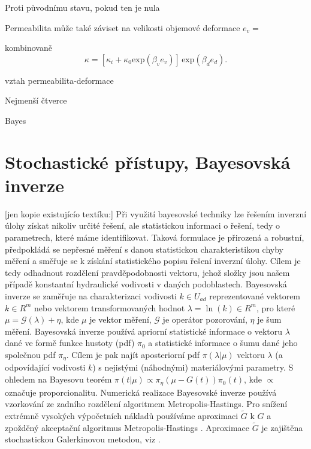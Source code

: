 \documentclass[a4paper]{article}
\begin{document}
Proti původnímu stavu, pokud ten je nula

Permeabilita může také záviset na velikosti objemové deformace $e_v = $

kombinovaně
$$
	\kappa = [\kappa_i + \kappa_0 \mbox{exp}(\beta_v e_v)]\, \mbox{exp}(\beta_d e_d).
$$

vztah permeabilita-deformace

Nejmenší čtverce

Bayes

\section{Stochastické přístupy, Bayesovská inverze}

[jen kopie existujícío textíku:] Při využití bayesovské techniky lze řešením
inverzní úlohy získat nikoliv určité řešení, ale statistickou informaci o řešení,
tedy o parametrech, které máme identifikovat. Taková formulace je přirozená
a robustní, předpokládá se nepřesné měření s danou statistickou charakteristikou
chyby měření a směřuje se k získání statistického popisu řešení inverzní
úlohy. Cílem je tedy odhadnout rozdělení pravděpodobnosti vektoru,
jehož složky jsou našem případě konstantní hydraulické vodivosti v daných
podoblastech. Bayesovská inverze se zaměřuje na charakterizaci vodivosti
$k \in U_{ad}$ reprezentované vektorem $k \in R^m$ nebo vektorem transformovaných
hodnot $\lambda = \ln(k) \in R^m$, pro které $\mu = \mathcal{G}(\lambda)+\eta$, kde $\mu$ je vektor měření, $\mathcal{G}$ je operátor pozorování, $\eta$ je šum měření. Bayesovská inverze používá apriorní statistické informace o vektoru $\lambda$ dané ve formě funkce hustoty (pdf) $\pi_0$ a statistické informace o šumu dané jeho společnou pdf $\pi_{\eta}$. Cílem je pak najít aposteriorní pdf $\pi(\lambda|\mu)$ vektoru $\lambda$ (a odpovídající vodivosti $k$) s nejistými
(náhodnými) materiálovými parametry. S ohledem na Bayesovu teorém
 $\pi(t|\mu) \propto \pi_{\eta}(\mu-G(t)) \pi_0 (t)$, kde $\propto$ označuje proporcionalitu. Numerická
realizace Bayesovské inverze používá vzorkování ze zadního rozdělení algoritmem
Metropolis-Hastings. Pro snížení extrémně vysokých výpočetních
nákladů používáme aproximaci $\tilde{G}$ k $G$ a zpožděný akceptační algoritmus
Metropolis-Hastings \cite{5}. Aproximace $\tilde{G}$ je zajištěna stochastickou Galerkinovou
metodou, viz \cite{5,6,7}.
\end{document}
